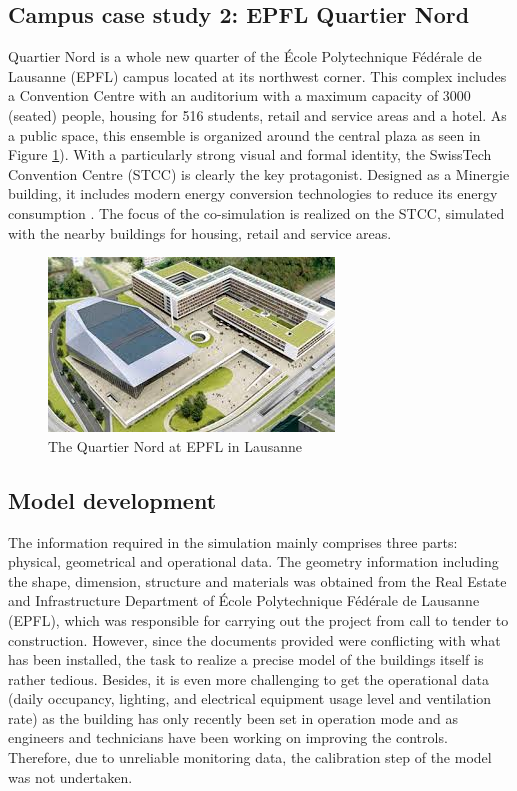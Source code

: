 \documentclass{tBPS2e}
\theoremstyle{plain}
\theoremstyle{definition}
\theoremstyle{remark}
\begin{document}
\subsection{Campus case study 2: EPFL Quartier Nord} 
Quartier Nord is a whole new quarter of the École Polytechnique Fédérale de
Lausanne (EPFL) campus located at its northwest corner. This complex includes
a Convention Centre with an auditorium with a maximum capacity of 3000
(seated) people, housing for 516 students, retail and service areas and a
hotel. As a public space, this ensemble is organized around the central plaza as
seen in Figure \ref{fig:quartier_nord_1}). With a particularly 
strong visual and formal identity, the SwissTech
Convention Centre (STCC) is clearly the key protagonist.  Designed as a
Minergie building, it includes modern energy conversion
technologies to reduce its energy consumption \citep{beyeler_minergie:_2009}. The focus of the co-simulation
is realized on the STCC, simulated with the nearby buildings for housing,
retail and service areas.

\begin{figure}[H]
\centering
\includegraphics[]{figures/quartier_nord_1}
\caption{The Quartier Nord at EPFL in Lausanne}
\label{fig:quartier_nord_1}
\end{figure}

\subsection{Model development}
The information required in the simulation mainly comprises three parts:
physical, geometrical and operational data. The geometry information including
the shape, dimension, structure and materials was obtained from the Real
Estate and Infrastructure Department of École Polytechnique Fédérale de
Lausanne (EPFL), which was responsible for carrying out the project from call
to tender to construction. However, since the documents provided were conflicting 
with what has been installed, the task to realize a precise model of the
buildings itself is rather tedious. Besides, it is even more challenging to
get the operational data (daily occupancy, lighting, and electrical equipment
usage level and ventilation rate) as the building has only recently been set
in operation mode and as engineers and technicians have been working on
improving the controls. Therefore, due to unreliable monitoring data, the
calibration step of the model was not undertaken.\\
\end{document}
